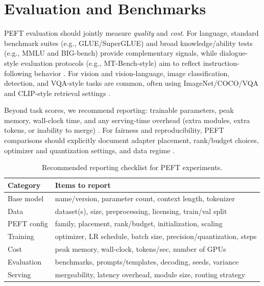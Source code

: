 \documentclass[conference]{IEEEtran}
\begin{document}
\section{Evaluation and Benchmarks}
PEFT evaluation should jointly measure \emph{quality} and \emph{cost}. For language, standard benchmark suites (e.g., GLUE/SuperGLUE) and broad knowledge/ability tests (e.g., MMLU and BIG-bench) provide complementary signals, while dialogue-style evaluation protocols (e.g., MT-Bench-style) aim to reflect instruction-following behavior \cite{wang2018glue,wang2019superglue,hendrycks2020measuring,srivastava2022beyond,zheng2023judging}. For vision and vision-language, image classification, detection, and VQA-style tasks are common, often using ImageNet/COCO/VQA and CLIP-style retrieval settings \cite{russakovsky2014imagenet,lin2014microsoft,agrawal2015vqa,radford2021learning}.

Beyond task scores, we recommend reporting: trainable parameters, peak memory, wall-clock time, and any serving-time overhead (extra modules, extra tokens, or inability to merge) \cite{han2024parameter,chen2023parameter}. For fairness and reproducibility, PEFT comparisons should explicitly document adapter placement, rank/budget choices, optimizer and quantization settings, and data regime \cite{dettmers2023qlora,zhang2023adalora,wang2024lora}.

\begin{table}[t]
    \centering
    \caption{Recommended reporting checklist for PEFT experiments.}
    \label{tab:peft-reporting}
    \scriptsize
    \setlength{\tabcolsep}{3pt}
    \begin{tabular}{p{1.7cm}p{5.5cm}}
        \toprule
        \textbf{Category} & \textbf{Items to report} \\
        \midrule
        Base model & name/version, parameter count, context length, tokenizer \\
        Data & dataset(s), size, preprocessing, licensing, train/val split \\
        PEFT config & family, placement, rank/budget, initialization, scaling \\
        Training & optimizer, LR schedule, batch size, precision/quantization, steps \\
        Cost & peak memory, wall-clock, tokens/sec, number of GPUs \\
        Evaluation & benchmarks, prompts/templates, decoding, seeds, variance \\
        Serving & mergeability, latency overhead, module size, routing strategy \\
        \bottomrule
    \end{tabular}
\end{table}
\end{document}
